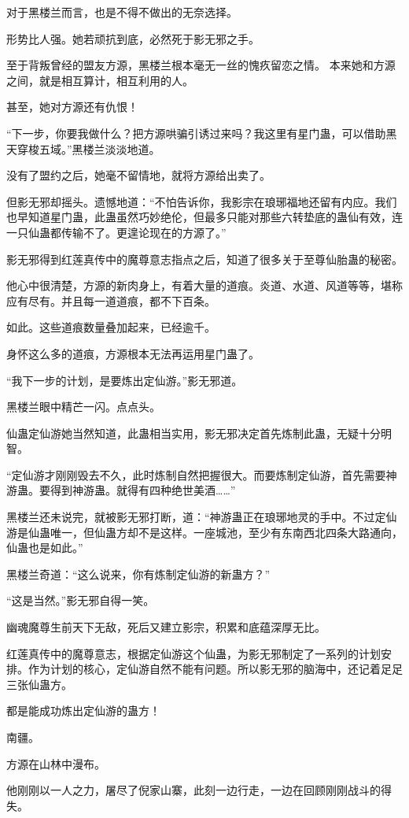 \begin{this_body}
对于黑楼兰而言，也是不得不做出的无奈选择。

形势比人强。她若顽抗到底，必然死于影无邪之手。

至于背叛曾经的盟友方源，黑楼兰根本毫无一丝的愧疚留恋之情。 本来她和方源之间，就是相互算计，相互利用的人。

甚至，她对方源还有仇恨！

“下一步，你要我做什么？把方源哄骗引诱过来吗？我这里有星门蛊，可以借助黑天穿梭五域。”黑楼兰淡淡地道。

没有了盟约之后，她毫不留情地，就将方源给出卖了。

但影无邪却摇头。遗憾地道：“不怕告诉你，我影宗在琅琊福地还留有内应。我们也早知道星门蛊，此蛊虽然巧妙绝伦，但最多只能对那些六转垫底的蛊仙有效，连一只仙蛊都传输不了。更遑论现在的方源了。”

影无邪得到红莲真传中的魔尊意志指点之后，知道了很多关于至尊仙胎蛊的秘密。

他心中很清楚，方源的新肉身上，有着大量的道痕。炎道、水道、风道等等，堪称应有尽有。并且每一道道痕，都不下百条。

如此。这些道痕数量叠加起来，已经逾千。

身怀这么多的道痕，方源根本无法再运用星门蛊了。

“我下一步的计划，是要炼出定仙游。”影无邪道。

黑楼兰眼中精芒一闪。点点头。

仙蛊定仙游她当然知道，此蛊相当实用，影无邪决定首先炼制此蛊，无疑十分明智。

“定仙游才刚刚毁去不久，此时炼制自然把握很大。而要炼制定仙游，首先需要神游蛊。要得到神游蛊。就得有四种绝世美酒……”

黑楼兰还未说完，就被影无邪打断，道：“神游蛊正在琅琊地灵的手中。不过定仙游是仙蛊唯一，但仙蛊方却不是这样。一座城池，至少有东南西北四条大路通向，仙蛊也是如此。”

黑楼兰奇道：“这么说来，你有炼制定仙游的新蛊方？”

“这是当然。”影无邪自得一笑。

幽魂魔尊生前天下无敌，死后又建立影宗，积累和底蕴深厚无比。

红莲真传中的魔尊意志，根据定仙游这个仙蛊，为影无邪制定了一系列的计划安排。作为计划的核心，定仙游自然不能有问题。所以影无邪的脑海中，还记着足足三张仙蛊方。

都是能成功炼出定仙游的蛊方！

南疆。

方源在山林中漫布。

他刚刚以一人之力，屠尽了倪家山寨，此刻一边行走，一边在回顾刚刚战斗的得失。


\end{this_body}
